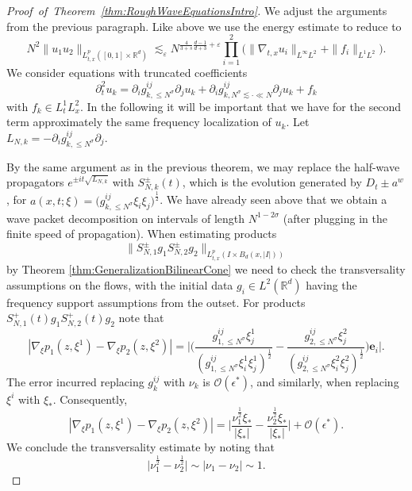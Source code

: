 \documentclass{amsart}
\theoremstyle{definition}
\newcommand{\R}{\mathbb{R}}
\begin{document}
\begin{proof}[Proof~of~Theorem~\ref{thm:RoughWaveEquationsIntro}]
We adjust the arguments from the previous paragraph.
Like above we use the energy estimate to reduce to
\begin{equation}
\label{eq:ClaimEnergyBilinearReduction}
    N^2 \| u_1 u_2 \|_{L^p_{t,x}([0,1] \times \R^d) } \lesssim_\varepsilon N^{\frac{4}{3+s} \frac{d-1}{d+3} + \varepsilon} \prod_{i=1}^2 \big( \| \nabla_{t,x} u_i \|_{L^\infty L^2} + \| f_i \|_{L^1 L^2} \big).
\end{equation}
We consider equations with truncated coefficients
\begin{equation*}
    \partial^2_t u_k = \partial_i g^{ij}_{k,\leq N^{\sigma}} \partial_j u_k + \partial_i g^{ij}_{k,N^{\sigma} \lesssim \cdot \ll N} \partial_j u_k + f_k
\end{equation*}
with $f_k \in L_t^1 L_x^2$. In the following it will be important that we have for the second term approximately the same frequency localization of $u_k$. Let $L_{N,k} = - \partial_i g_{k, \leq N^{\sigma}}^{ij} \partial_j$.

By the same argument as in the previous theorem, we may replace the half-wave propagators $e^{\pm i t \sqrt{L_{N,k}}} $ with $S_{N,k}^{\pm}(t)$, which is the evolution generated by $D_t \pm a^w$, for $a(x,t;\xi) = \big( g^{ij}_{k,\leq N^{\sigma}} \xi_i \xi_j \big)^{\frac{1}{2}}$. We have already seen above that we obtain a wave packet decomposition on intervals of length $N^{1-2 \sigma}$ (after plugging in the finite speed of propagation). When estimating products
\begin{equation*}
    \| S_{N,1}^{\pm} g_1 S_{N,2}^{\pm} g_2 \|_{L^p_{t,x}(I \times B_d(x,|I|))}
\end{equation*}
by Theorem \ref{thm:GeneralizationBilinearCone} we need to check the transversality assumptions on the flows, with the initial data $g_i \in L^2(\R^d)$ having the frequency support assumptions from the outset. For products $S_{N,1}^+(t) g_1 S^+_{N,2}(t) g_2$ note that
\begin{equation*}
| \nabla_{\xi} p_1(z,\xi^1) - \nabla_{\xi} p_2(z,\xi^2) | = \big| \big( \frac{g^{ij}_{1,\leq N^{\sigma}} \xi^1_j }{(g^{ij}_{1,\leq N^{\sigma}} \xi^1_i \xi^1_j)^{\frac{1}{2}}} - \frac{g^{ij}_{2,\leq N^{\sigma}} \xi^2_j }{(g^{ij}_{2,\leq N^{\sigma}} \xi^2_i \xi^2_j)^{\frac{1}{2}}} \big) \mathbf{e}_i \big|.
\end{equation*}
The error incurred replacing $g^{ij}_k$ with $\nu_k$ is $\mathcal{O}(\epsilon^*)$, and similarly, when replacing $\xi^i$ with $\xi_*$. Consequently,
\begin{equation*}
|\nabla_{\xi} p_1(z,\xi^1) - \nabla_{\xi} p_2(z,\xi^2)| = \big| \frac{\nu_1^{\frac{1}{2}} \xi_*}{|\xi_*|} - \frac{\nu_2^{\frac{1}{2}} \xi_*}{|\xi_*|} \big| + \mathcal{O}(\epsilon^*).
\end{equation*}
We conclude the transversality estimate by noting that
\begin{equation*}
\big| \nu_1^{\frac{1}{2}} - \nu_2^{\frac{1}{2}} \big| \sim |\nu_1 - \nu_2| \sim 1.
\end{equation*}


\end{proof}
\end{document}
